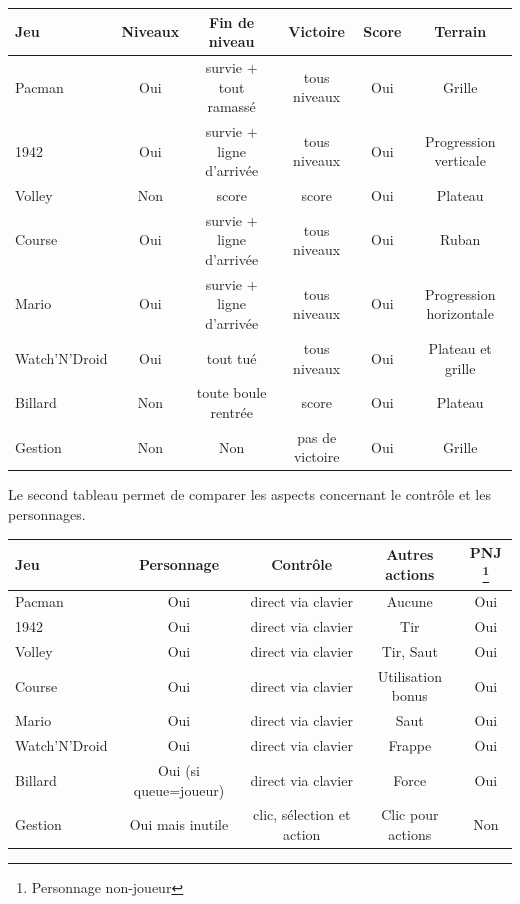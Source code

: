 \vspace{0.5cm}
\noindent
\begin{tabular}{|l|| c|c|c|c|c|}
\hline
 Jeu &  Niveaux & Fin de niveau & Victoire & Score & Terrain \\
\hline
 Pacman & Oui & survie + tout ramassé & tous niveaux & Oui & Grille \\
\hline
 1942 & Oui & survie + ligne d'arrivée & tous niveaux & Oui & Progression verticale \\
\hline
 Volley &  Non & score & score & Oui & Plateau \\
\hline
 Course & Oui & survie + ligne d'arrivée & tous niveaux & Oui & Ruban \\
\hline
 Mario & Oui & survie + ligne d'arrivée & tous niveaux & Oui & Progression horizontale\\
\hline
 Watch'N'Droid & Oui & tout tué & tous niveaux & Oui  & Plateau et grille\\
\hline
 Billard & Non & toute boule rentrée & score & Oui & Plateau \\
\hline
 Gestion & Non & Non & pas de victoire & Oui & Grille\\
\hline
\end{tabular}

\vspace{0.5cm}

Le second tableau permet de comparer les aspects concernant le contrôle et les personnages.

\vspace{0.5cm}
\noindent
\begin{tabular}{|l|| c|c|c|c|}
\hline
 Jeu & Personnage & Contrôle & Autres actions & PNJ \footnote{Personnage non-joueur} \\
\hline
 Pacman &  Oui & direct via clavier & Aucune &  Oui \\
\hline
 1942 & Oui & direct via clavier & Tir & Oui  \\
\hline
 Volley & Oui & direct via clavier  & Tir, Saut & Oui \\
\hline
 Course & Oui & direct via clavier & Utilisation bonus & Oui \\
\hline
 Mario & Oui & direct via clavier &  Saut & Oui \\
\hline
 Watch'N'Droid & Oui & direct via clavier & Frappe & Oui  \\
\hline 
 Billard &  Oui {\small (si queue=joueur)} & direct via clavier & Force & Oui  \\
\hline
 Gestion &  Oui mais inutile & clic, sélection et action & Clic pour actions & Non \\
\hline
\end{tabular}


